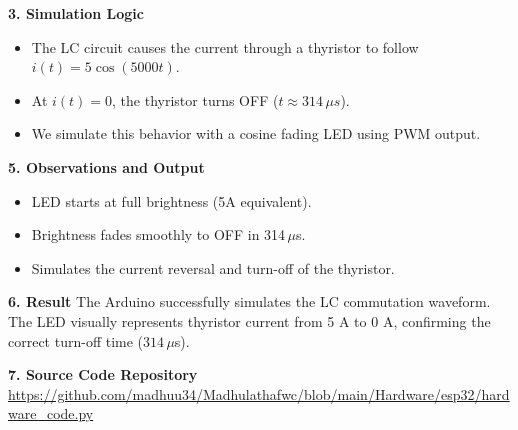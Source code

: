\documentclass[12pt]{article}
\begin{document}
\vspace{1em}
\noindent\textbf{3. Simulation Logic}
\begin{itemize}
    \item The LC circuit causes the current through a thyristor to follow $i(t) = 5\cos(5000t)$.
    \item At $i(t) = 0$, the thyristor turns OFF ($t \approx 314\,\mu s$).
    \item We simulate this behavior with a cosine fading LED using PWM output.
\end{itemize}

\vspace{1em}
\noindent\textbf{5. Observations and Output}
\begin{itemize}
    \item LED starts at full brightness (5A equivalent).
    \item Brightness fades smoothly to OFF in 314\,$\mu$s.
    \item Simulates the current reversal and turn-off of the thyristor.
\end{itemize}

\vspace{1em}
\noindent\textbf{6. Result}
The Arduino successfully simulates the LC commutation waveform. The LED visually represents thyristor current from 5 A to 0 A, confirming the correct turn-off time ($314\,\mu$s).

\vspace{1em}
\noindent\textbf{7. Source Code Repository} \\
\url{https://github.com/madhuu34/Madhulathafwc/blob/main/Hardware/esp32/hardware_code.py}
\end{document}
